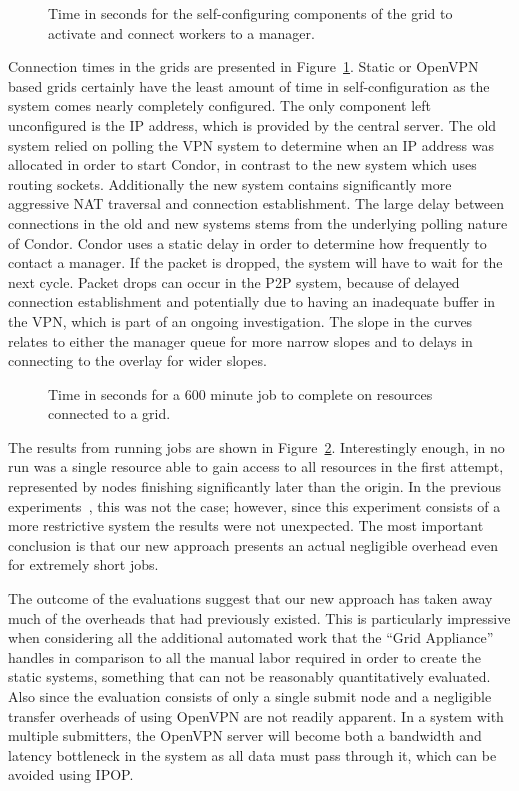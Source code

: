 \documentclass[twocolumn]{svjour3}
\begin{document}
\begin{figure}[ht]
\centering
{}
\caption{Time in seconds for the self-configuring components of the grid to
activate and connect workers to a manager.}
\label{fig:connect}
\end{figure}

Connection times in the grids are presented in Figure~\ref{fig:connect}.
Static or OpenVPN based grids certainly have the least amount of time in
self-configuration as the system comes nearly completely configured.  The only
component left unconfigured is the IP address, which is provided by the central
server.  The old system relied on polling the VPN system to determine when an
IP address was allocated in order to start Condor, in contrast to the new
system which uses routing sockets.  Additionally the new system contains
significantly more aggressive NAT traversal and connection establishment.  The
large delay between connections in the old and new systems stems from the
underlying polling nature of Condor.  Condor uses a static delay in order to
determine how frequently to contact a manager.  If the packet is dropped, the
system will have to wait for the next cycle.  Packet drops can occur in the P2P
system, because of delayed connection establishment and potentially due to
having an inadequate buffer in the VPN, which is part of an ongoing
investigation.  The slope in the curves relates to either the manager queue for
more narrow slopes and to delays in connecting to the overlay for wider slopes.

\begin{figure}[ht]
\centering
{}
\caption{Time in seconds for a 600 minute job to complete on resources
connected to a grid.}
\label{fig:run}
\end{figure}

The results from running jobs are shown in Figure~\ref{fig:run}.  Interestingly
enough, in no run was a single resource able to gain access to all resources in
the first attempt, represented by nodes finishing significantly later than the
origin.  In the previous experiments~\cite{hpdc11}, this was not the case;
however, since this experiment consists of a more restrictive system the
results were not unexpected.   The most important conclusion is that our new
approach presents an actual negligible overhead even for extremely short jobs.

The outcome of the evaluations suggest that our new approach has taken away
much of the overheads that had previously existed.  This is particularly
impressive when considering all the additional automated work that the ``Grid
Appliance'' handles in comparison to all the manual labor required in order to
create the static systems, something that can not be reasonably quantitatively
evaluated.  Also since the evaluation consists of only a single submit node and
a negligible transfer overheads of using OpenVPN are not readily apparent.  In
a system with multiple submitters, the OpenVPN server will become both a
bandwidth and latency bottleneck in the system as all data must pass through
it, which can be avoided using IPOP.  
\end{document}

